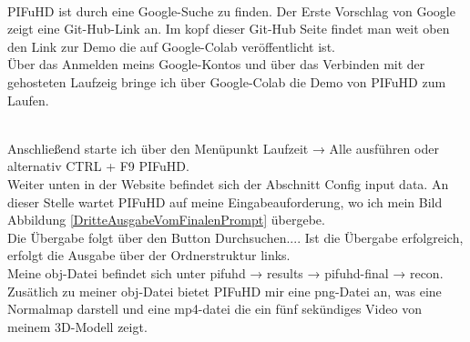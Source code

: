 \\
PIFuHD ist durch eine Google-Suche zu finden. Der Erste Vorschlag von Google zeigt eine Git-Hub-Link an. Im kopf dieser Git-Hub Seite findet man weit oben den Link zur Demo die auf Google-Colab veröffentlicht ist.
\\
Über das Anmelden meins Google-Kontos und über das Verbinden mit der gehosteten Laufzeig bringe ich über Google-Colab die Demo von PIFuHD zum Laufen.

\\
Anschließend starte ich über den Menüpunkt Laufzeit → Alle ausführen oder alternativ CTRL + F9 PIFuHD.
\\
Weiter unten in der Website befindet sich der Abschnitt Config input data. An dieser Stelle wartet PIFuHD auf meine Eingabeauforderung, wo ich mein Bild Abbildung \ref{DritteAusgabeVomFinalenPrompt} übergebe.
\\
Die Übergabe folgt über den Button Durchsuchen.... Ist die Übergabe erfolgreich, erfolgt die Ausgabe über der Ordnerstruktur links.
\\
Meine obj-Datei befindet sich unter pifuhd → results → pifuhd-final → recon. Zusätlich zu meiner obj-Datei bietet PIFuHD mir eine png-Datei an, was eine Normalmap darstell und eine mp4-datei die ein fünf sekündiges Video von meinem 3D-Modell zeigt.
\\

